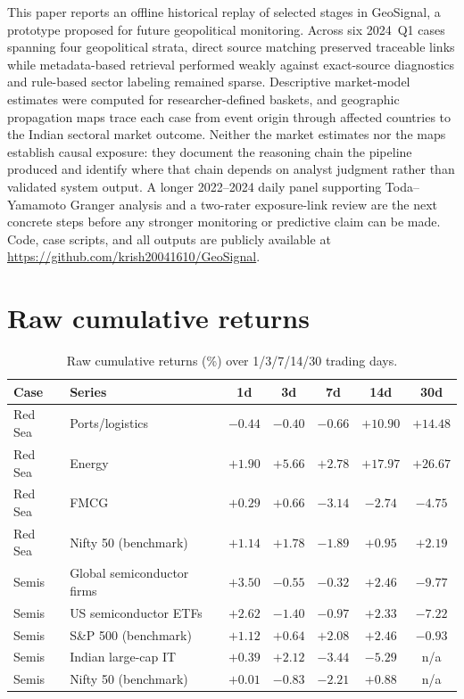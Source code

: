 \documentclass[10pt,a4paper,twocolumn]{article}
\begin{document}
This paper reports an offline historical replay of selected stages in GeoSignal, a prototype proposed for future geopolitical monitoring. Across six 2024~Q1 cases spanning four geopolitical strata, direct source matching preserved traceable links while metadata-based retrieval performed weakly against exact-source diagnostics and rule-based sector labeling remained sparse. Descriptive market-model estimates were computed for researcher-defined baskets, and geographic propagation maps trace each case from event origin through affected countries to the Indian sectoral market outcome. Neither the market estimates nor the maps establish causal exposure: they document the reasoning chain the pipeline produced and identify where that chain depends on analyst judgment rather than validated system output. A longer 2022--2024 daily panel supporting Toda--Yamamoto Granger analysis and a two-rater exposure-link review are the next concrete steps before any stronger monitoring or predictive claim can be made. Code, case scripts, and all outputs are publicly available at \url{https://github.com/krish20041610/GeoSignal}.

\appendix
\section{Raw cumulative returns}\label{app:raw}

\begin{table}[t]
\centering
\caption{Raw cumulative returns (\%) over 1/3/7/14/30 trading days.}
\small
\begin{tabular}{llccccc}
\toprule
\textbf{Case} & \textbf{Series} & \textbf{1d} & \textbf{3d} & \textbf{7d} & \textbf{14d} & \textbf{30d} \\
\midrule
Red Sea & Ports/logistics & $-0.44$ & $-0.40$ & $-0.66$ & $+10.90$ & $+14.48$ \\
Red Sea & Energy & $+1.90$ & $+5.66$ & $+2.78$ & $+17.97$ & $+26.67$ \\
Red Sea & FMCG & $+0.29$ & $+0.66$ & $-3.14$ & $-2.74$ & $-4.75$ \\
Red Sea & Nifty 50 (benchmark) & $+1.14$ & $+1.78$ & $-1.89$ & $+0.95$ & $+2.19$ \\
\midrule
Semis & Global semiconductor firms & $+3.50$ & $-0.55$ & $-0.32$ & $+2.46$ & $-9.77$ \\
Semis & US semiconductor ETFs & $+2.62$ & $-1.40$ & $-0.97$ & $+2.33$ & $-7.22$ \\
Semis & S\&P 500 (benchmark) & $+1.12$ & $+0.64$ & $+2.08$ & $+2.46$ & $-0.93$ \\
Semis & Indian large-cap IT & $+0.39$ & $+2.12$ & $-3.44$ & $-5.29$ & n/a \\
Semis & Nifty 50 (benchmark) & $+0.01$ & $-0.83$ & $-2.21$ & $+0.88$ & n/a \\
\bottomrule
\end{tabular}
\end{table}
\end{document}
